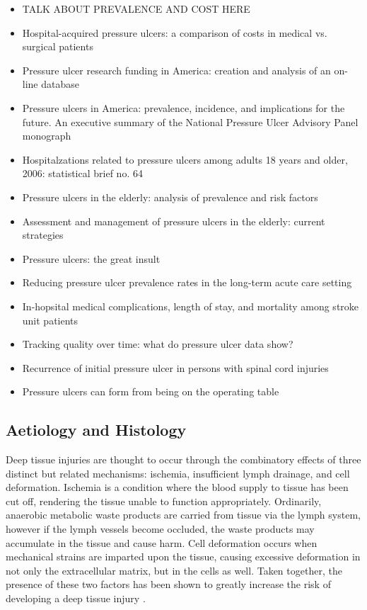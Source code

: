 		\begin{itemize}
			\item TALK ABOUT PREVALENCE AND COST HERE
			\item Hospital-acquired pressure ulcers: a comparison of costs in medical vs. surgical patients \cite{beckrich99}
			\item Pressure ulcer research funding in America: creation and analysis of an on-line database \cite{zanca03}
			\item Pressure ulcers in America: prevalence, incidence, and implications for the future. An executive summary of the National Pressure Ulcer Advisory Panel monograph \cite{npuapexecutive}
			\item Hospitalzations related to pressure ulcers among adults 18 years and older, 2006: statistical brief no. 64 \cite{russo08}
			\item Pressure ulcers in the elderly: analysis of prevalence and risk factors \cite{freitas11}
			\item Assessment and management of pressure ulcers in the elderly: current strategies \cite{jaul10}
			\item Pressure ulcers: the great insult \cite{maklebust05}
			\item Reducing pressure ulcer prevalence rates in the long-term acute care setting \cite{milne09}
			\item In-hopsital medical complications, length of stay, and mortality among stroke unit patients \cite{ingeman11}
			\item Tracking quality over time: what do pressure ulcer data show? \cite{gunningberg08}
			\item Recurrence of initial pressure ulcer in persons with spinal cord injuries \cite{niazi97}
			\item Pressure ulcers can form from being on the operating table \cite{aronovitch99}
		\end{itemize}

		\subsection{Aetiology and Histology}
			\label{sec:litreview-aetiology}
			Deep tissue injuries are thought to occur through the combinatory effects of three distinct but related mechanisms: ischemia, insufficient lymph drainage, and cell deformation. Ischemia is a condition where the blood supply to tissue has been cut off, rendering the tissue unable to function appropriately. Ordinarily, anaerobic metabolic waste products are carried from tissue via the lymph system, however if the lymph vessels become occluded, the waste products may accumulate in the tissue and cause harm. Cell deformation occurs when mechanical strains are imparted upon the tissue, causing excessive deformation in not only the extracellular matrix, but in the cells as well. Taken together, the presence of these two factors has been shown to greatly increase the risk of developing a deep tissue injury \cite{stekelenburg08}.

